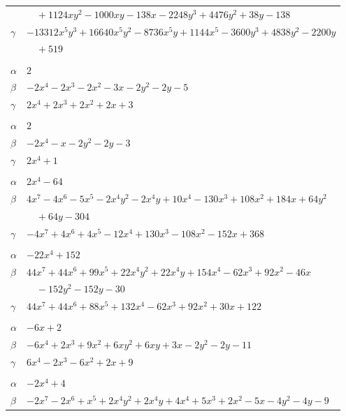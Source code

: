 \documentclass[11pt]{article}
\begin{document}
\begin{longtable}{@{}ll@{}}
 & $\quad +1124xy^{2}-1000xy-138x-2248y^{3}+4476y^{2}+38y-138$\\
$\gamma$ & $-13312x^{5}y^{3}+16640x^{5}y^{2}-8736x^{5}y+1144x^{5}-3600y^{3}+4838y^{2}-2200y$\\
 & $\quad +519$\\
\addlinespace[3pt]
\multicolumn{2}{@{}l}{$\{i,j\}=\{4,8\}$, $k_{ij}=2^{3}$}\\
$\alpha$ & $2$\\
$\beta$ & $-2x^{4}-2x^{3}-2x^{2}-3x-2y^{2}-2y-5$\\
$\gamma$ & $2x^{4}+2x^{3}+2x^{2}+2x+3$\\
\addlinespace[3pt]
\multicolumn{2}{@{}l}{$\{i,j\}=\{4,14\}$, $k_{ij}=2$}\\
$\alpha$ & $2$\\
$\beta$ & $-2x^{4}-x-2y^{2}-2y-3$\\
$\gamma$ & $2x^{4}+1$\\
\addlinespace[3pt]
\multicolumn{2}{@{}l}{$\{i,j\}=\{4,17\}$, $k_{ij}=2^{5}\cdot 3\cdot 7$}\\
$\alpha$ & $2x^{4}-64$\\
$\beta$ & $4x^{7}-4x^{6}-5x^{5}-2x^{4}y^{2}-2x^{4}y+10x^{4}-130x^{3}+108x^{2}+184x+64y^{2}$\\
 & $\quad +64y-304$\\
$\gamma$ & $-4x^{7}+4x^{6}+4x^{5}-12x^{4}+130x^{3}-108x^{2}-152x+368$\\
\addlinespace[3pt]
\multicolumn{2}{@{}l}{$\{i,j\}=\{4,19\}$, $k_{ij}=2\cdot 3\cdot 5$}\\
$\alpha$ & $-22x^{4}+152$\\
$\beta$ & $44x^{7}+44x^{6}+99x^{5}+22x^{4}y^{2}+22x^{4}y+154x^{4}-62x^{3}+92x^{2}-46x$\\
 & $\quad -152y^{2}-152y-30$\\
$\gamma$ & $44x^{7}+44x^{6}+88x^{5}+132x^{4}-62x^{3}+92x^{2}+30x+122$\\
\addlinespace[3pt]
\multicolumn{2}{@{}l}{$\{i,j\}=\{4,25\}$, $k_{ij}=2^{2}\cdot 5$}\\
$\alpha$ & $-6x+2$\\
$\beta$ & $-6x^{4}+2x^{3}+9x^{2}+6xy^{2}+6xy+3x-2y^{2}-2y-11$\\
$\gamma$ & $6x^{4}-2x^{3}-6x^{2}+2x+9$\\
\addlinespace[3pt]
\multicolumn{2}{@{}l}{$\{i,j\}=\{4,32\}$, $k_{ij}=2\cdot 7$}\\
$\alpha$ & $-2x^{4}+4$\\
$\beta$ & $-2x^{7}-2x^{6}+x^{5}+2x^{4}y^{2}+2x^{4}y+4x^{4}+5x^{3}+2x^{2}-5x-4y^{2}-4y-9$\\

\end{longtable}
\end{document}
